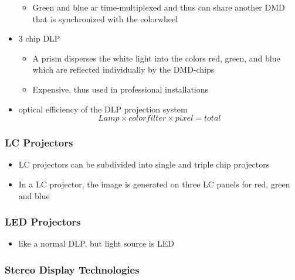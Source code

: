 \documentclass{standalone}
\begin{document}
\begin{itemize}
\begin{itemize}
\item Green and blue ar time-multiplexed and thus can share another DMD that is synchronized with the colorwheel
\end{itemize}
\item 3 chip DLP
\begin{itemize}
\item A prism disperses the white light into the colors red, green, and blue which are reflected individually by the DMD-chips
\item Expensive, thus used in professional installations
\end{itemize}
\item optical efficiency of the DLP projection system $$ Lamp \times colorfilter \times pixel = total$$
\end{itemize}
\subsubsection*{LC Projectors}
\begin{itemize}
\item LC projectors can be subdivided into single and triple chip projectors
\item In a LC projector, the image is generated on three LC panels for red, green and blue
\end{itemize}
\subsubsection*{LED Projectors}
\begin{itemize}
\item like a normal DLP, but light source is LED
\end{itemize}
\subsubsection{Stereo Display Technologies}
\end{document}
